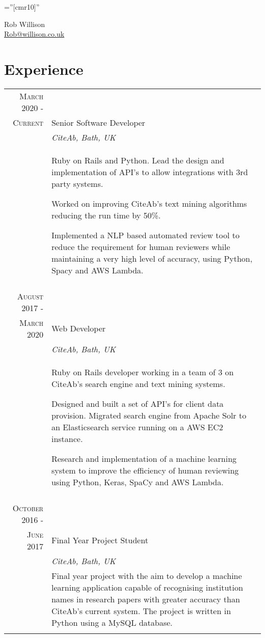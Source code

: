 \documentclass[a4paper,12pt]{article}
\begin{document}
\pagestyle{empty} %

\font\fb=''[cmr10]'' %


\par{\centering
		{\LARGE Rob Willison\\
		\small \href{mailto:Rob@willison.co.uk}{Rob@willison.co.uk
	}\bigskip\par}

\section{Experience}
\begin{tabular}{rp{11cm}}


\textsc{March} 2020 -\\ \textsc{Current} & Senior Software Developer
\\&\emph{CiteAb, Bath, UK}\\ &
\footnotesize{Ruby on Rails and Python. Lead the design and implementation of API's
to allow integrations with 3rd party systems.\par
Worked on improving CiteAb's text mining algorithms reducing the run time by 50\%.\par
Implemented a NLP based automated review tool to reduce the requirement for human reviewers while maintaining a very high level of accuracy, using Python, Spacy and AWS Lambda.
}\\\multicolumn{2}{c}{} \\

\textsc{August} 2017 -\\ \textsc{March} 2020 & Web Developer
\\&\emph{CiteAb, Bath, UK}\\ &
\footnotesize{Ruby on Rails developer working in a team of 3 on CiteAb's search engine and
text mining systems.\par
Designed and built a set of API's for client data provision.
Migrated search engine from Apache Solr to an Elasticsearch service running on a AWS EC2 instance.\par
Research and implementation of a machine learning system to improve the efficiency of human reviewing using Python, Keras, SpaCy and AWS Lambda.
}\\\multicolumn{2}{c}{} \\

\textsc{October} 2016 -\\ \textsc{June} 2017 & Final Year Project Student
\\&\emph{CiteAb, Bath, UK}\\ &
\footnotesize{Final year project with the aim to develop a machine learning application capable of recognising institution names
 in research papers with greater accuracy than CiteAb's current system. The project is written in Python using a  MySQL database.}\\\multicolumn{2}{c}{} \\


\end{tabular}}
\end{document}
